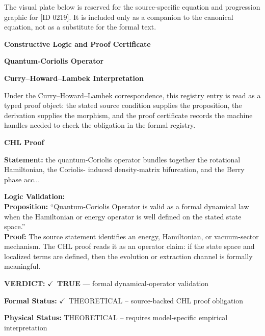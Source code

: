\begingroup\footnotesize\sloppy
The visual plate below is reserved for the source-specific equation and progression graphic for [ID 0219]. It is included only as a companion to the canonical equation, not as a substitute for the formal text.
\par\endgroup
\ifTZPDarkEdition
{}
\fi

\clearpage
\begingroup\tzpsupportsetup
\noindent\textbf{\fontsize{10.8pt}{12.8pt}\selectfont [ID 0219] Constructive Logic and Proof Certificate}\par
\noindent\textbf{\fontsize{10pt}{12pt}\selectfont Quantum-Coriolis Operator}\par
\vspace{0.45em}
\begingroup
\footnotesize
\setlength{\parskip}{0.22em}
\setlength{\parindent}{0pt}
\noindent\textbf{Curry--Howard--Lambek Interpretation}\par
Under the Curry--Howard--Lambek correspondence, this registry entry is read as a typed proof
object: the stated source condition supplies the proposition, the derivation supplies the
morphism, and the proof certificate records the machine handles needed to check the obligation
in the formal registry.

\vspace{0.45em}
\noindent\textbf{CHL Proof}\par
\textbf{Statement:} the quantum-Coriolis operator bundles together the rotational Hamiltonian, the Coriolis-
induced density-matrix bifurcation, and the Berry phase acc...

\textbf{Logic Validation:}\\
\textbf{Proposition:} ``Quantum-Coriolis Operator is valid as a formal dynamical law when the Hamiltonian or
energy operator is well defined on the stated state space.''\\
\textbf{Proof:} The source statement identifies an energy, Hamiltonian, or vacuum-sector mechanism. The
CHL proof reads it as an operator claim: if the state space and localized terms are
defined, then the evolution or extraction channel is formally meaningful.

\textbf{VERDICT:} \ensuremath{\checkmark}\ \textbf{TRUE} --- formal dynamical-operator validation

\textbf{Formal Status:} \ensuremath{\checkmark}\ THEORETICAL -- source-backed CHL proof obligation

\textbf{Physical Status:} THEORETICAL -- requires model-specific empirical interpretation
\par\vspace{0.45em}
\par
\ifTZPDarkEdition
{}
\fi
\endgroup
\endgroup
